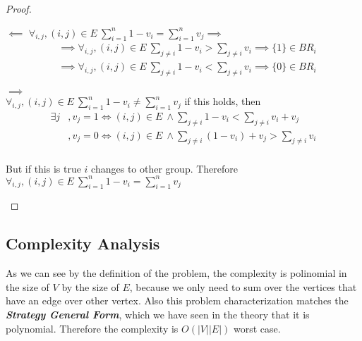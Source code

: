 \documentclass[12pt, a4paper]{article}
\begin{document}
\begin{proof}

\begin{proofpart}
$\impliedby$
$\forall_{i,j}, (i,j) \in E\ \sum_{i=1}^n 1 - v_i = \sum_{i=1}^n v_j \implies$
\begin{subequations}
  \begin{align}
     &\implies \forall_{i,j}, (i,j) \in E\ \sum_{j \neq i} 1 - v_i > \sum_{j \neq i} v_i \implies \{1\} \in BR_i\\
     &\implies \forall_{i,j}, (i,j) \in E\ \sum_{j \neq i} 1 - v_i < \sum_{j \neq i} v_i \implies \{0\} \in BR_i
  \end{align}
\end{subequations}
\end{proofpart}

\begin{proofpart}
$\implies$\\
$\forall_{i,j}, (i,j) \in E\ \sum_{i=1}^n 1 - v_i \neq \sum_{i=1}^n v_j$ if this holds, then \newline
\begin{subequations}
  \begin{align}
     \exists j &, v_j = 1 \iff (i,j) \in E\ \land \sum_{j \neq i} 1 - v_i < \sum_{j \neq i} v_i + v_j\\
               &, v_j = 0 \iff (i,j) \in E\ \land \sum_{j \neq i} (1 - v_i)+v_j > \sum_{j \neq i} v_i\\
  \end{align}
\end{subequations}

But if this is true $i$ changes to other group.\newline
Therefore $\forall_{i,j}, (i,j) \in E\ \sum_{i=1}^n 1 - v_i = \sum_{i=1}^n v_j$
\end{proofpart}

\end{proof}

\subsection{Complexity Analysis}
As we can see by the definition of the problem, the complexity is polinomial in the size of $V$ by the size of $E$, because we only need to sum over the vertices that have
an edge over other vertex. Also this problem characterization matches the \textbf{\textit{Strategy General Form}}, which we have seen in the theory that it is polynomial.
Therefore the complexity is $O(|V||E|)$ worst case.
\end{document}
